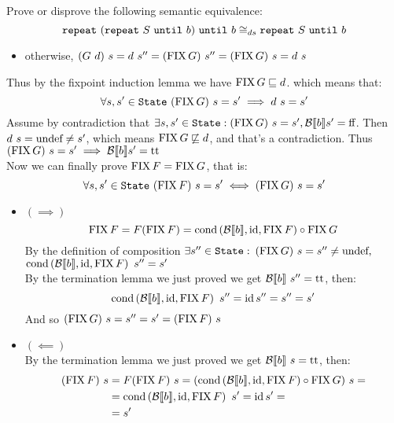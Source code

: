 \begin{exercise}{
    Prove or disprove the following semantic equivalence:
    \[ \wrepeat{(\wrepeat{S}{b})}{b} \DScong \wrepeat{S}{b} \]
}
\begin{itemize}
\begin{itemize}
                \item otherwise, $(G\ d)\ s = d\ s'' = (\FIX G)\ s'' = (\FIX G)\ s = d\ s$
            \end{itemize}
    \end{itemize}
    Thus by the fixpoint induction lemma we have $\FIX G \sqsubseteq d$. which means that:
    \[ \forall s, s' \in \State\ (\FIX G)\ s = s' \implies d\ s = s' \]
    Assume by contradiction that $\exists s, s' \in \State : (\FIX G)\ s = s', \Bool{b} s' = \False $. Then $d\ s = \undef \neq s'$, which means $\FIX G \not\sqsubseteq d$, and that's a contradiction. Thus $(\FIX G)\ s = s' \implies \Bool{b} s' = \True$ \\
    Now we can finally prove $\FIX F = \FIX G$, that is:
    \[ \forall s, s' \in \State\ (\FIX F)\ s = s' \iff (\FIX G)\ s = s' \]
    \begin{itemize}
        \item $(\implies)$
            \[ \FIX F = F(\FIX F) = \cond{\Bool{b}}{\id}{\FIX F} \circ \FIX G \]
            By the definition of composition $\exists s'' \in \State :$ $(\FIX G)\ s = s'' \neq \undef,$ \\ $\cond{\Bool{b}}{\id}{\FIX F}\ s'' = s'$ \\
            By the termination lemma we just proved we get $\Bool{b}\ s'' = \True$, then:
            \[ \cond{\Bool{b}}{\id}{\FIX F}\ s'' = \id s'' = s'' = s' \]
            And so $(\FIX G)\ s = s'' = s' = (\FIX F)\ s$
        \item $(\impliedby)$ \\
            By the termination lemma we just proved we get $\Bool{b}\ s = \True$, then:
            \begin{align*}
                (\FIX F)\ s &= F(\FIX F)\ s = (\cond{\Bool{b}}{\id}{\FIX F} \circ \FIX G)\ s = \\
                &= \cond{\Bool{b}}{\id}{\FIX F}\ s' = \id s' = \\
                &= s'
            \end{align*}
    \end{itemize}
\end{exercise}
